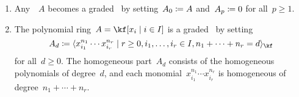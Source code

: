 \begin{examples}
  \label{examples for graded algebras}
  \leavevmode
  \begin{enumerate}
    \item
      Any~\algebra{$\kf$}~$A$ becomes a graded~\algebra{$\kf$} by setting~$A_0 \coloneqq A$ and~$A_p \coloneqq 0$ for all~$p \geq 1$.
    \item
      The polynomial ring~$A = \kf[x_i \suchthat i \in I]$ is a graded~\algebra{$\kf$} by setting
      \[
        A_d
        \defined
        \gen{
          x_{i_1}^{n_1} \dotsm x_{i_r}^{n_r}
        \suchthat
          r \geq 0,
          i_1, \dotsc, i_r \in I,
          n_1 + \dotsb + n_r = d
        }_{\kf}
      \]
      for all~$d \geq 0$.
      The homogeneous part~$A_d$ consists of the homogeneous polynomials of degree~$d$, and each monomial~$x_{i_1}^{n_1} \dotsm x_{i_r}^{n_r}$ is homogeneous of degree~$n_1 + \dotsb + n_r$.
      

\end{enumerate}
\end{examples}

